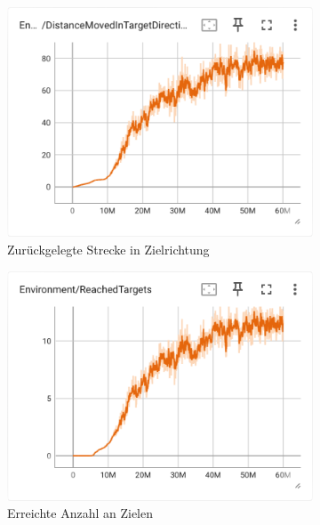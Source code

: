 \begin{figure}[H]
  \centering  
    \begin{subfigure}{.49\textwidth}
      \centering  
      \includegraphics[width=\textwidth]{img/113_move_target_dir}
      \caption{Zurückgelegte Strecke in Zielrichtung}
      \label{fig:113_move_target_dir}
    \end{subfigure}
    \begin{subfigure}{.49\textwidth}
      \centering  
      \includegraphics[width=\textwidth]{img/113_reach_target}
      \caption{Erreichte Anzahl an Zielen}
      \label{fig:113_reach_target}
    \end{subfigure}
    \begin{subfigure}{.49\textwidth}

\end{subfigure}
\end{figure}

